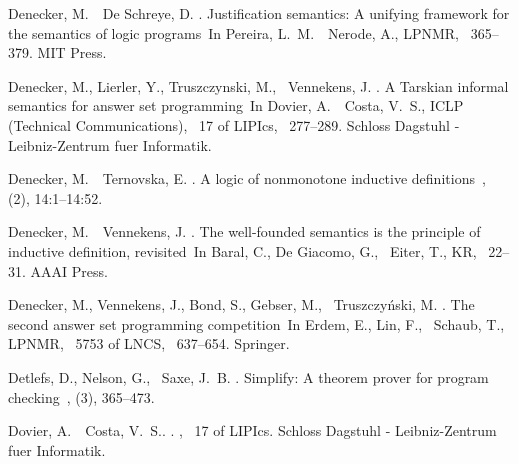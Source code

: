 \documentclass[11pt]{article}
\theoremstyle{plain}
\theoremstyle{definition}
\theoremstyle{example_basic}
\theoremstyle{example_contd}
\theoremstyle{plain}
\begin{document}
\begin{thebibliography}{}
Denecker, M.\BBACOMMA\  \BBA\ {De Schreye}, D. \BBCP.
\newblock \BBOQ Justification semantics: A unifying framework for the semantics
  of logic programs\BBCQ\
\newblock In Pereira, L.~M.\BBACOMMA\  \BBA\ Nerode, A.\BEDS, {\Bem LPNMR},
  \BPGS\ 365--379. MIT Press.

Denecker, M., Lierler, Y., Truszczynski, M., \BBA\ Vennekens, J.
  \BBOP2012\BBCP.
\newblock \BBOQ A {T}arskian informal semantics for answer set
  programming\BBCQ\
\newblock In Dovier, A.\BBACOMMA\  \BBA\ Costa, V.~S.\BEDS, {\Bem ICLP
  (Technical Communications)}, \lowercase{\BVOL}~17 of {\Bem LIPIcs}, \BPGS\
  277--289. Schloss Dagstuhl - Leibniz-Zentrum fuer Informatik.

Denecker, M.\BBACOMMA\  \BBA\ Ternovska, E. \BBOP2008\BBCP.
\newblock \BBOQ A logic of nonmonotone inductive definitions\BBCQ\
, {\/}(2), 14:1--14:52.

Denecker, M.\BBACOMMA\  \BBA\ Vennekens, J. \BBCP.
\newblock \BBOQ The well-founded semantics is the principle of inductive
  definition, revisited\BBCQ\
\newblock In Baral, C., {De Giacomo}, G., \BBA\ Eiter, T.\BEDS, {\Bem KR},
  \BPGS\ 22--31. AAAI Press.

Denecker, M., Vennekens, J., Bond, S., Gebser, M., \BBA\ Truszczy{\'n}ski, M.
  \BBOP2009\BBCP.
\newblock \BBOQ The second answer set programming competition\BBCQ\
\newblock In Erdem, E., Lin, F., \BBA\ Schaub, T.\BEDS, {\Bem LPNMR},
  \lowercase{\BVOL}\ 5753 of {\Bem LNCS}, \BPGS\ 637--654. Springer.

Detlefs, D., Nelson, G., \BBA\ Saxe, J.~B. \BBOP2005\BBCP.
\newblock \BBOQ Simplify: A theorem prover for program checking\BBCQ\
, {\/}(3), 365--473.

Dovier, A.\BBACOMMA\  \BBA\ Costa, V.~S.\BEDS. \BBOP2012\BBCP.
, \lowercase{\BVOL}~17 of {\Bem LIPIcs}. Schloss Dagstuhl -
  Leibniz-Zentrum fuer Informatik.


\end{thebibliography}
\end{document}
